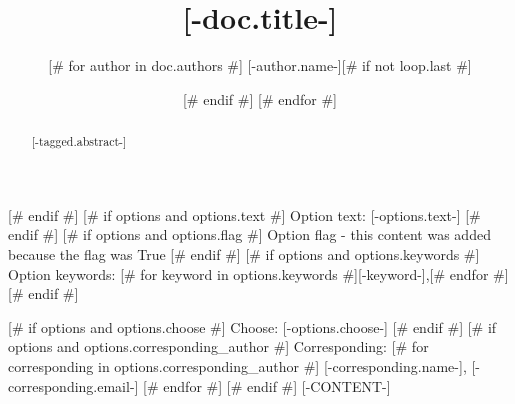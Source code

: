 \title{[-doc.title-]}
\author{[# for author in doc.authors #]
[-author.name-][# if not loop.last #] \and [# endif #]
[# endfor #]
}
\date{}

\begin{abstract}
[-tagged.abstract-]
\end{abstract}
[# endif #]
[# if options and options.text #]
Option text: [-options.text-]
[# endif #]
[# if options and options.flag #]
Option flag - this content was added because the flag was True
[# endif #]
[# if options and options.keywords #]
Option keywords:
[# for keyword in options.keywords #][-keyword-],[# endfor #]
[# endif #]

[# if options and options.choose #]
Choose:
[-options.choose-]
[# endif #]
[# if options and options.corresponding_author #]
Corresponding:
[# for corresponding in options.corresponding_author #]
[-corresponding.name-], [-corresponding.email-]
[# endfor #]
[# endif #]
[-CONTENT-]
